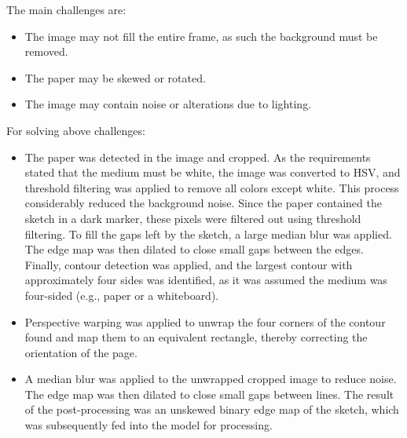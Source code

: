 The main challenges are:
\begin{itemize}
    \item The image may not fill the entire frame, as such the background must be
removed. 
    \item The paper may be skewed or rotated.
    \item The image may contain noise or alterations due to lighting.
\end{itemize}

For solving above challenges:
\begin{itemize}
    \item The paper was detected in the image and cropped. As the requirements stated that the medium must be white, the image was converted to HSV, and threshold filtering was applied to remove all colors except white. This process considerably reduced the background noise. Since the paper contained the sketch in a dark marker, these pixels were filtered out using threshold filtering. To fill the gaps left by the sketch, a large median blur was applied. The edge map was then dilated to close small gaps between the edges. Finally, contour detection was applied, and the largest contour with approximately four sides was identified, as it was assumed the medium was four-sided (e.g., paper or a whiteboard).
    \item Perspective warping was applied to unwrap the four corners of the contour found and map them to an equivalent rectangle, thereby correcting the orientation of the page.
    \item A median blur was applied to the unwrapped cropped image to reduce noise. The edge map was then dilated to close small gaps between lines. The result of the post-processing was an unskewed binary edge map of the sketch, which was subsequently fed into the model for processing.
\end{itemize}

